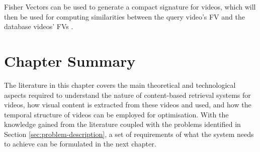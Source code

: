 Fisher Vectors can be used to generate a compact signature for videos, which will then be used for computing similarities between the query video's FV and the database videos' FVs \cite{araujo2017i2v}.\\


\section{Chapter Summary}

The literature in this chapter covers the main theoretical and technological aspects required to understand the nature of content-based retrieval systems for videos, how visual content is extracted from these videos and used, and how the temporal structure of videos can be employed for optimisation. With the knowledge gained from the literature coupled with the problems identified in Section \ref{sec:problem-description}, a set of requirements of what the system needs to achieve can be formulated in the next chapter.